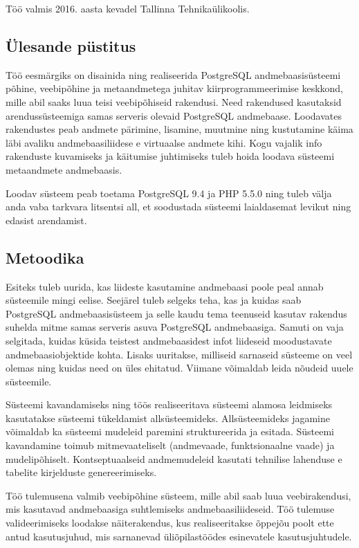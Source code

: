 \documentclass[a4paper,12pt]{article} %
\begin{document}
Töö valmis 2016. aasta kevadel Tallinna Tehnikaülikoolis.

\subsection{Ülesande püstitus}
Töö eesmärgiks on disainida ning realiseerida PostgreSQL andmebaasisüsteemi põhine, veebipõhine ja metaandmetega juhitav kiirprogrammeerimise keskkond, mille abil saaks luua teisi veebipõhiseid rakendusi. Need rakendused kasutaksid arendussüsteemiga samas serveris olevaid PostgreSQL andmebaase. Loodavates rakendustes peab andmete pärimine, lisamine, muutmine ning kustutamine käima läbi avaliku andmebaasiliidese e virtuaalse andmete kihi. Kogu vajalik info rakenduste kuvamiseks ja käitumise juhtimiseks tuleb hoida loodava süsteemi metaandmete andmebaasis.\par
Loodav süsteem peab toetama PostgreSQL 9.4 ja PHP 5.5.0 ning tuleb välja anda vaba tarkvara litsentsi all, et soodustada süsteemi laialdasemat levikut ning edasist arendamist.

\subsection{Metoodika}
Esiteks tuleb uurida, kas liideste kasutamine andmebaasi poole peal annab süsteemile mingi eelise. Seejärel tuleb selgeks teha, kas ja kuidas saab PostgreSQL andmebaasisüsteem ja selle kaudu tema teenuseid kasutav rakendus suhelda mitme samas serveris asuva PostgreSQL andmebaasiga. Samuti on vaja selgitada, kuidas küsida teistest andmebaasidest infot liideseid moodustavate andmebaasiobjektide kohta. Lisaks uuritakse, milliseid sarnaseid süsteeme on veel olemas ning kuidas need on üles ehitatud. Viimane võimaldab leida nõudeid uuele süsteemile.\par
Süsteemi kavandamiseks ning töös realiseeritava süsteemi alamosa leidmiseks kasutatakse süsteemi tükeldamist allsüsteemideks. Allsüsteemideks jagamine võimaldab ka süsteemi mudeleid paremini struktureerida ja esitada. Süsteemi kavandamine toimub mitmevaateliselt (andmevaade, funktsionaalne vaade) ja mudelipõhiselt. Kontseptuaalseid andmemudeleid kasutati tehnilise lahenduse e tabelite kirjelduste genereerimiseks.\par
Töö tulemusena valmib veebipõhine süsteem, mille abil saab luua veebirakendusi, mis kasutavad andmebaasiga suhtlemiseks andmebaasiliideseid. Töö tulemuse valideerimiseks loodakse näiterakendus, kus realiseeritakse õppejõu poolt ette antud kasutusjuhud, mis sarnanevad üliõpilastöödes esinevatele kasutusjuhtudele.
\end{document}
